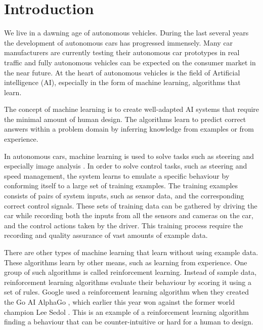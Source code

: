 \chapter{Introduction}
\label{introduction}

We live in a dawning age of autonomous vehicles. During the last several years the development of autonomous cars has progressed immensely. Many car manufacturers are currently testing their autonomous car prototypes in real traffic and fully autonomous vehicles can be expected on the consumer market in the near future. At the heart of autonomous vehicles is the field of Artificial intelligence (AI), especially in the form of machine learning, algorithms that learn.

The concept of machine learning is to create well-adapted AI systems that require the minimal amount of human design. The algorithms learn to predict correct answers within a problem domain by inferring knowledge from examples or from experience. 

In autonomous cars, machine learning is used to solve tasks such as steering and especially image analysis \cite{Stavens, Thrun06, huval2015empirical}. In order to solve control tasks, such as steering and speed management, the system learns to emulate a specific behaviour by conforming itself to a large set of training examples. The training examples consists of pairs of system inputs, such as sensor data, and the corresponding correct control signals. These sets of training data can be gathered by driving the car while recording both the inputs from all the sensors and cameras on the car, and the control actions taken by the driver. This training process require the recording and quality assurance of vast amounts of example data.

There are other types of machine learning that learn without using example data. These algorithms learn by other means, such as learning from experience. One group of such algorithms is called reinforcement learning. Instead of sample data, reinforcement learning algorithms evaluate their behaviour by scoring it using a set of rules. Google used a reinforcement learning algorithm when they created the Go AI AlphaGo \cite{gibney}, which earlier this year won against the former world champion Lee Sedol \cite{AlphaGo}. This is an example of a reinforcement learning algorithm finding a behaviour that can be counter-intuitive or hard for a human to design.

